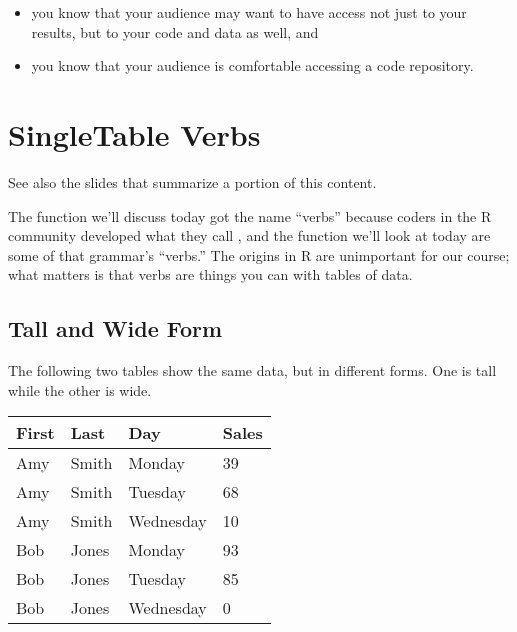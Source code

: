 \documentclass[letterpaper,10pt,english]{sphinxmanual}
\begin{document}
\begin{itemize}
\begin{itemize}
\item {} 
you know that your audience may want to have access not just to your results, but to your code and data as well, and

\item {} 
you know that your audience is comfortable accessing a code repository.

\end{itemize}

\end{itemize}


\chapter{Single\sphinxhyphen{}Table Verbs}
\label{\detokenize{chapter-6-single-table-verbs:single-table-verbs}}\label{\detokenize{chapter-6-single-table-verbs::doc}}
See also the slides that summarize a portion of this content.

The function we’ll discuss today got the name “verbs” because coders in the R community developed what they call , and the function we’ll look at today are some of that grammar’s “verbs.”  The origins in R are unimportant for our course; what matters is that verbs are things you can  with tables of data.


\section{Tall and Wide Form}
\label{\detokenize{chapter-6-single-table-verbs:tall-and-wide-form}}
The following two tables show the same data, but in different forms.  One is tall while the other is wide.



\begin{savenotes}\sphinxattablestart
\centering
\begin{tabulary}{\linewidth}[t]{|T|T|T|T|}
\hline
\sphinxstyletheadfamily 
First
&\sphinxstyletheadfamily 
Last
&\sphinxstyletheadfamily 
Day
&\sphinxstyletheadfamily 
Sales
\\
\hline
Amy
&
Smith
&
Monday
&
39
\\
\hline
Amy
&
Smith
&
Tuesday
&
68
\\
\hline
Amy
&
Smith
&
Wednesday
&
10
\\
\hline
Bob
&
Jones
&
Monday
&
93
\\
\hline
Bob
&
Jones
&
Tuesday
&
85
\\
\hline
Bob
&
Jones
&
Wednesday
&
0
\\
\hline
\end{tabulary}
\par
\sphinxattableend\end{savenotes}
\end{document}
